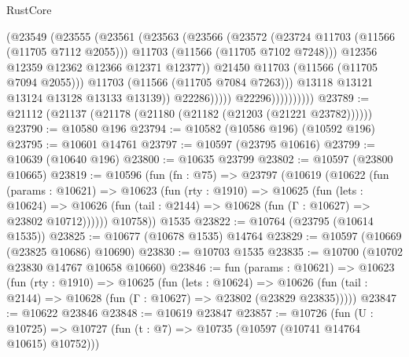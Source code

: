 \begin{lexlean}{RustCore}
\begin{coremodule}
                                    (@23549
                                      (@23555
                                        (@23561
                                          (@23563
                                            (@23566
                                              (@23572
                                                (@23724 @11703 (@11566 (@11705 @7112 @2055)))
                                                @11703
                                                (@11566 (@11705 @7102 @7248)))
                                              @12356
                                              @12359
                                              @12362
                                              @12366
                                              @12371
                                              @12377))
                                          @21450
                                          @11703
                                          (@11566 (@11705 @7094 @2055)))
                                        @11703
                                        (@11566 (@11705 @7084 @7263)))
                                      @13118
                                      @13121
                                      @13124
                                      @13128
                                      @13133
                                      @13139))
                                  @22286)))))
                        @22296))))))))))
@23789 := @21112 (@21137 (@21178 (@21180 (@21182 (@21203 (@21221 @23782))))))
@23790 := @10580 @196
@23794 := @10582 (@10586 @196) (@10592 @196)
@23795 := @10601 @14761
@23797 := @10597 (@23795 @10616)
@23799 := @10639 (@10640 @196)
@23800 := @10635 @23799
@23802 := @10597 (@23800 @10665)
@23819 := @10596
    (fun (fn : @75) =>
    @23797
      (@10619
        (@10622
          (fun (params : @10621) =>
          @10623
            (fun (rty : @1910) =>
            @10625
              (fun (lets : @10624) =>
              @10626 (fun (tail : @2144) => @10628 (fun (Γ : @10627) => @23802 @10712))))))
        @10758))
    @1535
@23822 := @10764 (@23795 (@10614 @1535))
@23825 := @10677 (@10678 @1535) @14764
@23829 := @10597 (@10669 (@23825 @10686) @10690)
@23830 := @10703 @1535
@23835 := @10700 (@10702 @23830 @14767 @10658 @10660)
@23846 := fun (params : @10621) =>
  @10623
    (fun (rty : @1910) =>
    @10625
      (fun (lets : @10624) =>
      @10626 (fun (tail : @2144) => @10628 (fun (Γ : @10627) => @23802 (@23829 @23835)))))
@23847 := @10622 @23846
@23848 := @10619 @23847
@23857 := @10726
    (fun (U : @10725) => @10727 (fun (t : @7) => @10735 (@10597 (@10741 @14764 @10615) @10752)))

\end{coremodule}
\end{lexlean}
